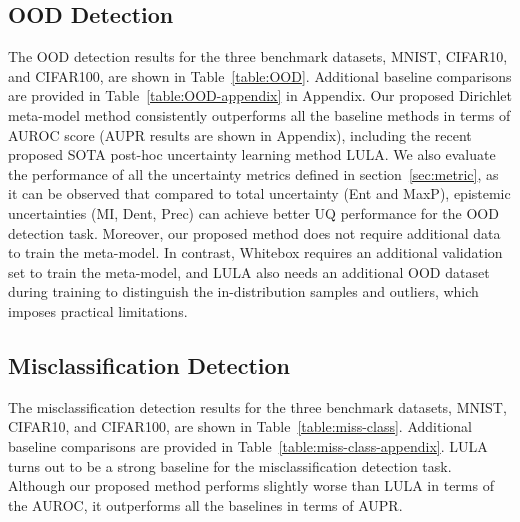 \subsection{OOD Detection}\label{sec:OOD}
The OOD detection results for the three benchmark datasets, MNIST, CIFAR10, and CIFAR100, are shown in Table~\ref{table:OOD}. Additional baseline comparisons are provided in Table~\ref{table:OOD-appendix} in Appendix. Our proposed Dirichlet meta-model method consistently outperforms all the baseline methods in terms of AUROC score (AUPR results are shown in Appendix), including the recent proposed SOTA post-hoc uncertainty learning method LULA. We also evaluate the performance of all the uncertainty metrics defined in section~\ref{sec:metric}, as it can be observed that compared to total uncertainty (Ent and MaxP), epistemic uncertainties (MI, Dent, Prec) can achieve better UQ performance for the OOD detection task. Moreover, our proposed method does not require additional data to train the meta-model. In contrast, Whitebox requires an additional validation set to train the meta-model, and LULA also needs an additional OOD dataset during training to distinguish the in-distribution samples and outliers, which imposes practical limitations.


\subsection{Misclassification Detection}\label{sec:Miss}
The misclassification detection results for the three benchmark datasets, MNIST, CIFAR10, and CIFAR100, are shown in Table~\ref{table:miss-class}. Additional baseline comparisons are provided in Table~\ref{table:miss-class-appendix}. LULA turns out to be a strong baseline for the misclassification detection task. Although our proposed method performs slightly worse than LULA in terms of the AUROC, it outperforms all the baselines in terms of AUPR.

